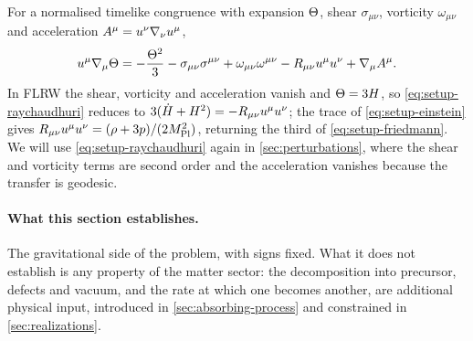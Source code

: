 For a normalised timelike congruence with expansion $\Theta$, shear
$\sigma_{\mu\nu}$, vorticity $\omega_{\mu\nu}$ and acceleration
$A^\mu=u^\nu\nabla_\nu u^{\mu}$,
%
\begin{equation}\label{eq:setup-raychaudhuri}
  u^\mu\nabla_\mu\Theta=-\frac{\Theta^2}{3}
  -\sigma_{\mu\nu}\sigma^{\mu\nu}+\omega_{\mu\nu}\omega^{\mu\nu}
  -R_{\mu\nu}u^{\mu} u^\nu+\nabla_\mu A^\mu .
\end{equation}
%
In FLRW the shear, vorticity and acceleration vanish and $\Theta=3H$,
so \cref{eq:setup-raychaudhuri} reduces to $3(\dot {H}+H^2)=-R_{\mu\nu}u^{\mu}
u^\nu$; the trace of \cref{eq:setup-einstein} gives $R_{\mu\nu}u^{\mu}
u^\nu=(\rho+3p)/(2M_{\mathrm{Pl}}^2)$, returning the third of
\cref{eq:setup-friedmann}. We will use \cref{eq:setup-raychaudhuri} again in
\cref{sec:perturbations}, where the shear and vorticity terms are second order
and the acceleration vanishes because the transfer is geodesic.

\paragraph{What this section establishes.}
The gravitational side of the problem, with signs fixed. What it does not
establish is any property of the matter sector: the decomposition into
precursor, defects and vacuum, and the rate at which one becomes another, are
additional physical input, introduced in \cref{sec:absorbing-process} and
constrained in \cref{sec:realizations}.
